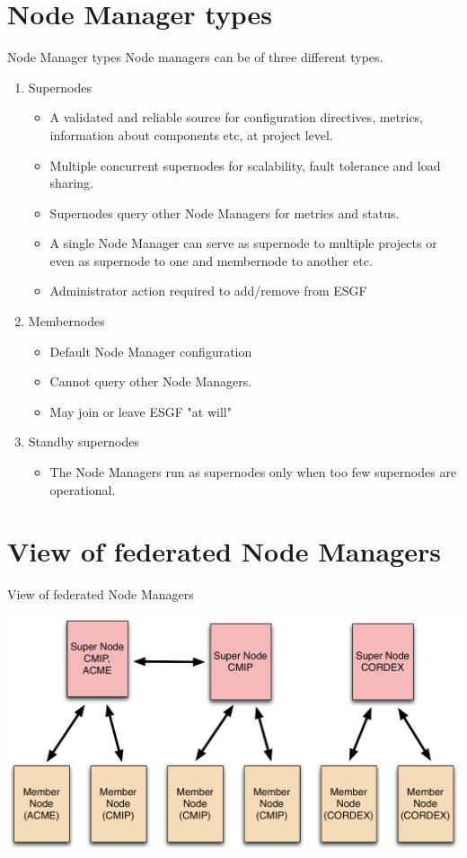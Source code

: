 \documentclass{beamer}
\begin{document}
\section{Node Manager types}
\begin{frame}{Node Manager types}
Node managers can be of three different types.
\begin{enumerate}
\item Supernodes
\begin{itemize}
\item A validated and reliable source for configuration directives, metrics, information about components etc, at project level.
\item Multiple concurrent supernodes for scalability, fault tolerance and load sharing.
\item Supernodes query other Node Managers for metrics and status.
\item A single Node Manager can serve as supernode to multiple projects or even as supernode to one and membernode to another etc.
\item Administrator action required to add/remove from ESGF
\end{itemize}
\item Membernodes
\begin{itemize}
\item Default Node Manager configuration
\item Cannot query other Node Managers.
\item May join or leave ESGF "at will"
\end{itemize}
\item Standby supernodes
\begin{itemize}
\item The Node Managers run as supernodes only when too few supernodes are operational.
\end{itemize}
\end{enumerate}
\end{frame}



\section{View of federated Node Managers}
\begin{frame}{View of federated Node Managers}
\begin{center}
\includegraphics[scale=0.35]{ESG-node-org.pdf}
\end{center}
\end{frame}
\end{document}

